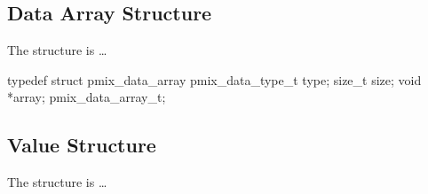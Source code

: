 \subsection{Data Array Structure}

The  structure is \ldots

\cspecificstart
\begin{codepar}
typedef struct pmix_data_array {
    pmix_data_type_t type;
    size_t size;
    void *array;
} pmix_data_array_t;
\end{codepar}
\cspecificend


\subsection{Value Structure}

The  structure is \ldots

